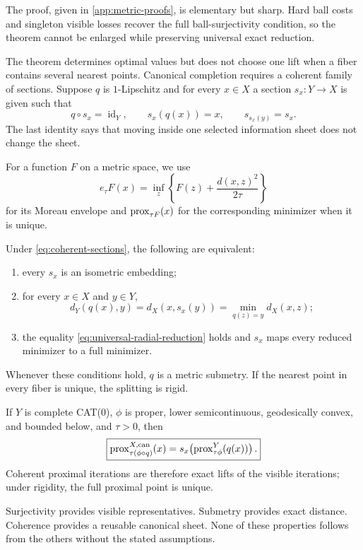 The proof, given in \cref{app:metric-proofs}, is elementary but sharp.  Hard
ball costs and singleton visible losses recover the full ball-surjectivity
condition, so the theorem cannot be enlarged while preserving universal exact
reduction.

The theorem determines optimal values but does not choose one lift when a
fiber contains several nearest points.  Canonical completion requires a
coherent family of sections.  Suppose \(q\) is \(1\)-Lipschitz and for every
\(x\in X\) a section \(s_x:Y\to X\) is given such that
\begin{equation}
  q\circ s_x=\operatorname{id}_Y,
  \qquad
  s_x(q(x))=x,
  \qquad
  s_{s_x(y)}=s_x.
  \label{eq:coherent-sections}
\end{equation}
The last identity says that moving inside one selected information sheet does
not change the sheet.

For a function \(F\) on a metric space, we use
\[
  e_\tau F(x)=\inf_z\left\{F(z)+\frac{d(x,z)^2}{2\tau}\right\}
\]
for its Moreau envelope and \(\operatorname{prox}_{\tau F}(x)\) for the corresponding
minimizer when it is unique.

\begin{theorem}
\label{thm:coherent-reduction}
Under \eqref{eq:coherent-sections}, the following are equivalent:
\begin{enumerate}[label=(\Alph*),leftmargin=*]
  \item every \(s_x\) is an isometric embedding;
  \item for every \(x\in X\) and \(y\in Y\),
  \begin{equation}
    d_Y(q(x),y)
    =d_X(x,s_x(y))
    =\min_{q(z)=y}d_X(x,z);
    \label{eq:coherent-fiber-distance}
  \end{equation}
  \item the equality \eqref{eq:universal-radial-reduction} holds and
  \(s_x\) maps every reduced minimizer to a full minimizer.
\end{enumerate}
Whenever these conditions hold, \(q\) is a metric submetry.  If the nearest
point in every fiber is unique, the splitting is rigid.

If \(Y\) is complete CAT(0), \(\phi\) is proper, lower semicontinuous,
geodesically convex, and bounded below, and \(\tau>0\), then
\begin{equation}
  \boxed{
  \operatorname{prox}^{X,\mathrm{can}}_{\tau(\phi\circ q)}(x)
  =
  s_x\!\left(\operatorname{prox}^Y_{\tau\phi}(q(x))\right).}
  \label{eq:coherent-prox}
\end{equation}
Coherent proximal iterations are therefore exact lifts of the visible
iterations; under rigidity, the full proximal point is unique.
\end{theorem}

\begin{remark}
Surjectivity provides visible representatives.  Submetry provides exact
distance.  Coherence provides a reusable canonical sheet.  None of these
properties follows from the others without the stated assumptions.
\end{remark}
